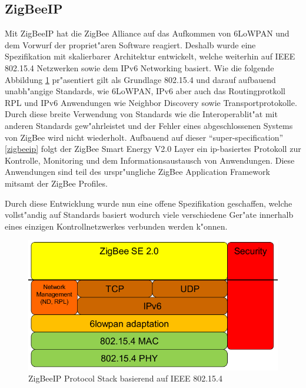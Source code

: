 \documentclass[final]{lktseminar}
\begin{document}
\subsection{ZigBeeIP}
\label{sec: ZigBeeIP}

Mit ZigBeeIP hat die ZigBee Alliance auf das Aufkommen von 6LoWPAN und dem Vorwurf der propriet"aren Software
reagiert. Deshalb wurde eine Spezifikation mit skalierbarer Architektur entwickelt, welche weiterhin auf IEEE
802.15.4 Netzwerken sowie dem IPv6 Networking basiert. Wie die folgende Abbildung \ref{fig:zigbeeip} pr"asentiert
gilt als Grundlage 802.15.4 und darauf aufbauend unabh"angige Standards, wie 6LoWPAN, IPv6 aber auch
 das Routingprotkoll RPL und IPv6 Anwendungen wie Neighbor Discovery sowie Transportprotokolle.
 Durch diese breite Verwendung von Standards wie die Interoperablit"at mit anderen Standards gew"ahrleistet
 und der Fehler eines abgeschlossenen Systems von ZigBee wird nicht wiederholt.
 Aufbauend auf dieser ``super-specification'' \ref{zigbeeip} folgt der ZigBee Smart Energy V2.0 Layer
 ein ip-basiertes Protokoll zur Kontrolle, Monitoring und dem Informationsaustausch von
 Anwendungen. Diese Anwendungen sind teil des urspr"ungliche ZigBee Application Framework
 mitsamt der ZigBee Profiles.

 Durch diese Entwicklung wurde nun eine offene Spezifikation geschaffen, welche vollst"andig auf Standards basiert
 wodurch viele verschiedene Ger"ate innerhalb eines einzigen Kontrollnetzwerkes verbunden werden k"onnen.

\begin{figure}[h]
    \centering
    \includegraphics[scale=0.5]{zigbeeip_stack.png}
    \caption{ZigBeeIP Protocol Stack basierend auf IEEE 802.15.4 \cite{zigbeeip}}
    \label{fig:zigbeeip}
\end{figure}

\end{document}
